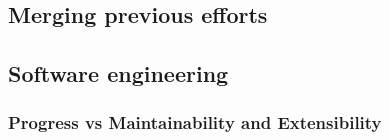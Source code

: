 \subsection{Merging previous efforts}
\subsection{Software engineering}
	\subsubsection{Progress vs Maintainability and Extensibility}
	\subsubsection{}